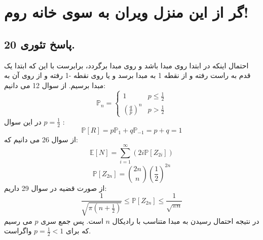 \documentclass[]{article}
\begin{document}
\section{گر از این منزل ویران به سوی خانه روم!}
\subsection{پاسخ تئوری 20.}
احتمال اینکه در ابتدا روی مبدا باشد و روی مبدا برگردد، برابرست با این که ابتدا یک قدم به راست رفته و از نقطه 1 به مبدا برسد و یا روی نقطه -1 رفته و از روی آن به مبدا برسیم. از سوال 12 می دانیم:
\begin{equation}
	\nonumber
	\mathbb{P}_n =
	\begin{cases}
		1 &\mbox{$p \leqslant \frac{1}{2}$}\\
		(\frac{q}{p})^n &\mbox{$p > \frac{1}{2}$}
	\end{cases}
\end{equation}
در این سوال 
$p = \frac{1}{2}$ :
\begin{equation}
	\nonumber
	\mathbb{P}[R] = p \mathbb{P}_1 + q \mathbb{P}_{-1} = p + q = 1
\end{equation}
از سوال 26 می دانیم که:
\begin{equation}
	\nonumber
	\mathbb{E}[N] = \sum_{i = 1}^{\infty} (2i \mathbb{P}[Z_{2i}]) 
\end{equation}
\begin{equation}
	\nonumber
	\mathbb{P}[Z_{2n}] = \binom{2n}{n} (\frac{1}{2})^{2n}
\end{equation}
از صورت قضیه در سوال 29 داریم:
\begin{equation}
	\nonumber
	\frac{1}{\sqrt{\pi (n + \frac{1}{2})}} \leqslant \mathbb{P}[Z_{2n}] \leqslant \frac{1}{\sqrt{\pi n}}
\end{equation}
در نتیجه احتمال رسیدن به مبدا متناسب با رادیکال $n$ است. پس جمع سری $p$ می رسیم که برای 
$p = \frac{1}{2} < 1$
واگراست.
\newpage
\end{document}
